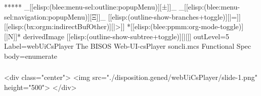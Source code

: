 \begin{whenOrg}
*****  _[[elisp:(blee:menu-sel:outline:popupMenu)][±]]_ _[[elisp:(blee:menu-sel:navigation:popupMenu)][Ξ]]_ [[elisp:(outline-show-branches+toggle)][|=]] [[elisp:(bx:orgm:indirectBufOther)][|>]] *[[elisp:(blee:ppmm:org-mode-toggle)][|N]]*  derivedImage [[elisp:(outline-show-subtree+toggle)][||]] outLevel=5 Label=webUiCsPlayer The BISOS Web-UI-csPlayer soncli.mcs Functional Spec body=enumerate
\end{whenOrg}

\begin{htmlonly}

\begin{frame}[fragile,plain,label=webUiCsPlayer]
    \frametitle{}
    \framesubtitle{}
    \begin{rawhtml}
<div class="center">
<img src="./disposition.gened/webUiCsPlayer/slide-1.png" height="500">
</div>
    \end{rawhtml}
\end{frame}
\end{htmlonly}

